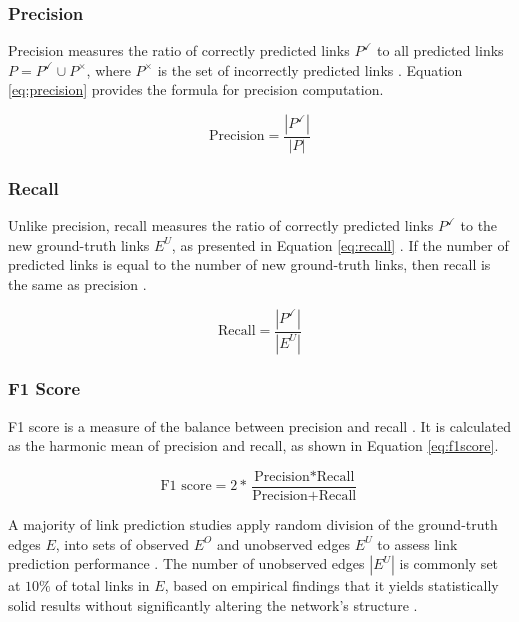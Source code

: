\subsubsection{Precision}

Precision measures the ratio of correctly predicted links $P^\checkmark$ to all predicted links $P = P^\checkmark \cup P^\times$, where $P^\times$ is the set of incorrectly predicted links \cite{arrar2023comprehensive, zhou2021progresses}. Equation \ref{eq:precision} provides the formula for precision computation.

\begin{equation}
\label{eq:precision}
  \text{Precision} = \frac{|P^\checkmark|}{|P|}
\end{equation}


\subsubsection{Recall}

Unlike precision, recall measures the ratio of correctly predicted links $P^\checkmark$ to the new ground-truth links $E^U$, as presented in Equation \ref{eq:recall} \cite{arrar2023comprehensive, zhou2021progresses}. If the number of predicted links is equal to the number of new ground-truth links, then recall is the same as precision \cite{zhou2021progresses, lu2011link, liben2003link}.

\begin{equation}
\label{eq:recall}
  \text{Recall} = \frac{|P^\checkmark|}{|E^U|}
\end{equation}


\subsubsection{F1 Score}

F1 score is a measure of the balance between precision and recall \cite{arrar2023comprehensive}. It is calculated as the harmonic mean of precision and recall, as shown in Equation \ref{eq:f1score}.

\begin{equation}
\label{eq:f1score}
  \text{F1 score} = 2 * \frac{\text{Precision} * \text{Recall}}{\text{Precision} + \text{Recall}}
\end{equation}

A majority of link prediction studies apply random division of the ground-truth edges $E$, into sets of observed $E^O$ and unobserved edges $E^U$ to assess link prediction performance \cite{zhou2021progresses}. The number of unobserved edges $|E^U|$ is commonly set at $10\%$ of total links in $E$, based on empirical findings that it yields statistically solid results without significantly altering the network's structure \cite{lu2015toward}.




